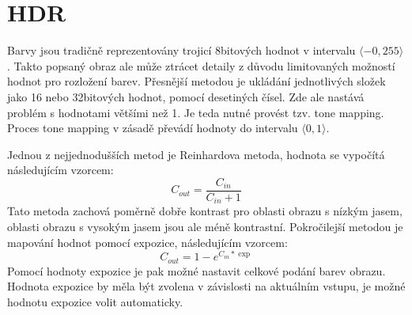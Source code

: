 \section{HDR}
Barvy jsou tradičně reprezentovány trojicí 8bitových hodnot v intervalu  $\langle-0, 255\rangle$. Takto popsaný obraz ale může ztrácet detaily z důvodu limitovaných možností hodnot pro rozložení barev. Přesnější metodou je ukládání jednotlivých složek jako 16 nebo 32bitových hodnot, pomocí desetiných čísel. Zde ale nastává problém s hodnotami většími než 1. Je teda nutné provést tzv. tone mapping. Proces tone mapping v zásadě převádí hodnoty do intervalu $\langle0, 1\rangle$. \par
Jednou z nejjednodušších metod je Reinhardova metoda, hodnota se vypočítá následujícím vzorcem: 
\begin{equation}
    C_{out} = \frac{C_{in}}{C_{in} + 1}    
\end{equation}
Tato metoda zachová poměrně dobře kontrast pro oblasti obrazu s nízkým jasem, oblasti obrazu s vysokým jasem jsou ale méně kontrastní. 
Pokročilejší metodou je mapování hodnot pomocí expozice, následujícím vzorcem:
\begin{equation}
    C_{out} = 1 - e^{C_{in} * \exp}
\end{equation}
Pomocí hodnoty expozice je pak možné nastavit celkové podání barev obrazu. Hodnota expozice by měla být zvolena v závislosti na aktuálním vstupu, je možné hodnotu expozice volit automaticky. 